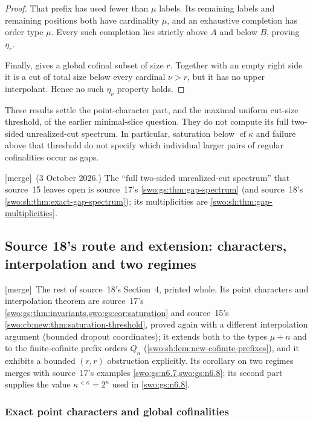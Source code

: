 \documentclass[11pt]{article}
\theoremstyle{definition}
\theoremstyle{remark}
\newcommand{\cf}{\operatorname{cf}}
\newcommand{\merge}{\textsf{[merge]}}
\begin{document}
\begin{proof}
That prefix has used fewer than $\mu$ labels.  Its remaining labels
and remaining positions both have cardinality $\mu$, and an
exhaustive completion has order type $\mu$.  Every such completion
lies strictly above $A$ and below $B$, proving $\eta_r$.

Finally,  gives a global
cofinal subset of size $r$.  Together with an empty right side
it is a cut of total size below every cardinal $\nu>r$, but
it has no upper interpolant.  Hence no such $\eta_\nu$ property
holds.
\end{proof}

These results settle the point-character part, and the maximal uniform
cut-size threshold, of the earlier minimal-slice question.  They do
not compute its full two-sided unrealized-cut spectrum.  In
particular, saturation below $\cf\kappa$ and failure above that
threshold do not specify which individual larger pairs of regular
cofinalities occur as gaps.

\smallskip\noindent\merge\ (3 October 2026.) The ``full two-sided
unrealized-cut spectrum'' that source~15 leaves open is source~17's
\cref{swo:gs:thm:gap-spectrum} (and source~18's
\cref{swo:sh:thm:exact-gap-spectrum}); its multiplicities are
\cref{swo:sh:thm:gap-multiplicities}.

\subsection{Source 18's route and extension: characters, interpolation and two regimes}
\label{swo:vi:sub:sh-chars}

\merge\ The rest of source~18's Section~4, printed whole. Its point
characters and interpolation theorem are source~17's
\cref{swo:gs:thm:invariants,swo:gs:cor:saturation} and source~15's
\cref{swo:cb:new:thm:saturation-threshold}, proved again with a different
interpolation argument (bounded dropout coordinates); it extends both to the
types $\mu+n$ and to the finite-cofinite prefix orders $Q_n$
(\cref{swo:sh:lem:new-cofinite-prefixes}), and it exhibits a bounded $(r,r)$
obstruction explicitly. Its corollary on two regimes merges with source~17's
examples \cref{swo:gs:n6.7,swo:gs:n6.8}; its second part supplies the value
$\kappa^{<\kappa}=2^\kappa$ used in \cref{swo:gs:n6.8}.

\subsubsection{Exact point characters and global cofinalities}
\end{document}
